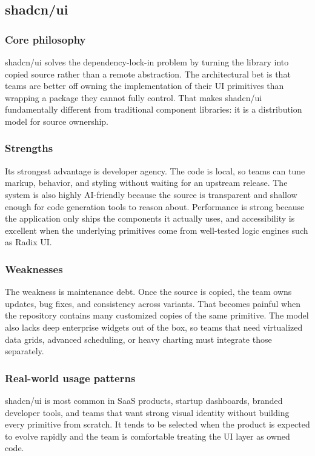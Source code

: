 \documentclass[11pt,twoside,a4paper]{article}
\begin{document}
\subsection{shadcn/ui}
\subsubsection{Core philosophy}
shadcn/ui solves the dependency-lock-in problem by turning the library into copied source rather than a remote abstraction. The architectural bet is that teams are better off owning the implementation of their UI primitives than wrapping a package they cannot fully control. That makes shadcn/ui fundamentally different from traditional component libraries: it is a distribution model for source ownership.

\subsubsection{Strengths}
Its strongest advantage is developer agency. The code is local, so teams can tune markup, behavior, and styling without waiting for an upstream release. The system is also highly AI-friendly because the source is transparent and shallow enough for code generation tools to reason about. Performance is strong because the application only ships the components it actually uses, and accessibility is excellent when the underlying primitives come from well-tested logic engines such as Radix UI.

\subsubsection{Weaknesses}
The weakness is maintenance debt. Once the source is copied, the team owns updates, bug fixes, and consistency across variants. That becomes painful when the repository contains many customized copies of the same primitive. The model also lacks deep enterprise widgets out of the box, so teams that need virtualized data grids, advanced scheduling, or heavy charting must integrate those separately.

\subsubsection{Real-world usage patterns}
shadcn/ui is most common in SaaS products, startup dashboards, branded developer tools, and teams that want strong visual identity without building every primitive from scratch. It tends to be selected when the product is expected to evolve rapidly and the team is comfortable treating the UI layer as owned code.
\end{document}
